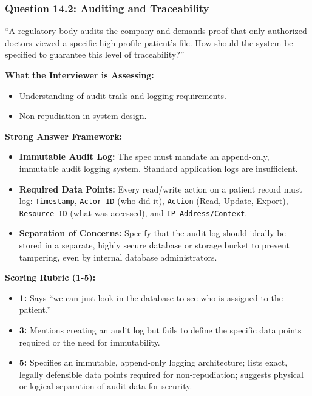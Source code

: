 \subsubsection{Question 14.2: Auditing and
Traceability}\label{question-14.2-auditing-and-traceability}

``A regulatory body audits the company and demands proof that only
authorized doctors viewed a specific high-profile patient's file. How
should the system be specified to guarantee this level of
traceability?''

\textbf{What the Interviewer is Assessing:}

\begin{itemize}
\tightlist
\item
  Understanding of audit trails and logging requirements.
\item
  Non-repudiation in system design.
\end{itemize}

\textbf{Strong Answer Framework:}

\begin{itemize}
\tightlist
\item
  \textbf{Immutable Audit Log:} The spec must mandate an append-only,
  immutable audit logging system. Standard application logs are
  insufficient.
\item
  \textbf{Required Data Points:} Every read/write action on a patient
  record must log: \texttt{Timestamp}, \texttt{Actor\ ID} (who did it),
  \texttt{Action} (Read, Update, Export), \texttt{Resource\ ID} (what
  was accessed), and \texttt{IP\ Address/Context}.
\item
  \textbf{Separation of Concerns:} Specify that the audit log should
  ideally be stored in a separate, highly secure database or storage
  bucket to prevent tampering, even by internal database administrators.
\end{itemize}

\textbf{Scoring Rubric (1-5):}

\begin{itemize}
\tightlist
\item
  \textbf{1:} Says ``we can just look in the database to see who is
  assigned to the patient.''
\item
  \textbf{3:} Mentions creating an audit log but fails to define the
  specific data points required or the need for immutability.
\item
  \textbf{5:} Specifies an immutable, append-only logging architecture;
  lists exact, legally defensible data points required for
  non-repudiation; suggests physical or logical separation of audit data
  for security.
\end{itemize}

